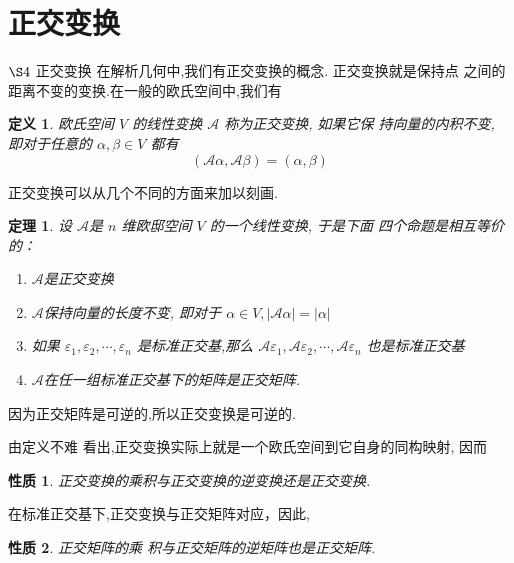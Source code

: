 \documentclass[13pt]{beamer}
\newtheorem{thm}{定理}
\newtheorem*{defi}{定义}
\newtheorem*{prop}{性质}
\begin{document}
\section{正交变换}
\begin{frame}{$\S 4$ 正交变换}
在解析几何中,我们有正交变换的概念.
正交变换就是保持点 之间的距离不变的变换.在一般的欧氏空间中,我们有 
\begin{defi}
欧氏空间 $V$ 的线性变换 $\mathscr{A}$
称为正交变换, 如果它保 持向量的内积不变,
即对于任意的 ${\alpha}, {\beta} \in V$ 都有 $$(\mathscr{A} {\alpha}, \mathscr{A} {\beta})=({\alpha}, {\beta})$$
\end{defi}
\end{frame}



\begin{frame}
正交变换可以从几个不同的方面来加以刻画.  

\begin{thm}
设 $\mathscr{A}$是 $n$ 维欧邸空间 $V$ 的一个线性变换, 于是下面 四个命题是相互等价的：
\begin{enumerate}
	\item $\mathscr{A}$是正交变换
	\item $\mathscr{A}$保持向量的长度不变, 即对于 ${\alpha} \in V,|\mathscr{A} {\alpha}|=| {\alpha} |$
	\item 如果 ${\varepsilon}_{1}, {\varepsilon}_{2}, \cdots, {\varepsilon}_{n}$ 是标准正交基,那么 $\mathscr{A} {\varepsilon}_{1}, \mathscr{A} {\varepsilon}_{2}, \cdots, \mathscr{A}{\varepsilon}_{n}$
	也是标准正交基
	\item $\mathscr{A}$在任一组标准正交基下的矩阵是正交矩阵.
\end{enumerate}
\end{thm}

\end{frame}

\begin{frame}
因为正交矩阵是可逆的,所以正交变换是可逆的.

由定义不难 看出,正交变换实际上就是一个欧氏空间到它自身的同构映射, 因而
\begin{prop}
正交变换的乘积与正交变换的逆变换还是正交变换. 
\end{prop}


 在标准正交基下,正交变换与正交矩阵对应，因此,
\begin{prop}
正交矩阵的乘 积与正交矩阵的逆矩阵也是正交矩阵.  
\end{prop}
\end{frame}
\end{document}
